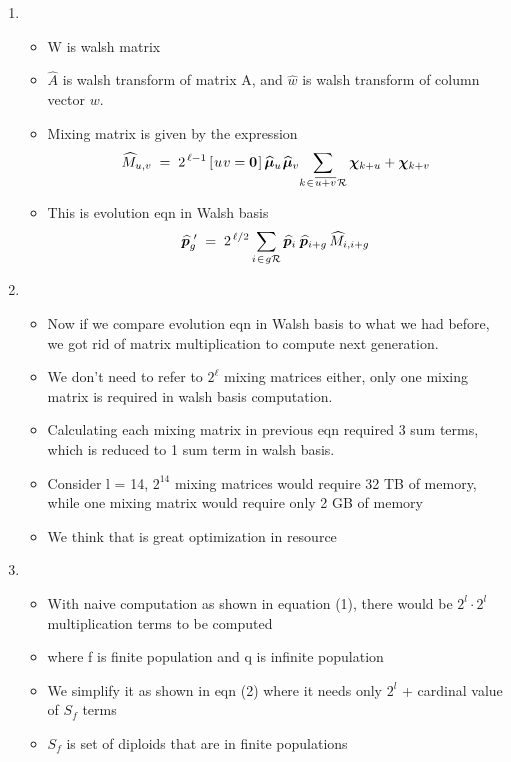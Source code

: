 \documentclass{article}
\newcommand{\nudge}{\hspace{0.01in}}
\begin{document}
\begin{enumerate}
\item
  \begin{itemize}
  \item W is walsh matrix
  \item $\hat{A}$ is walsh transform of matrix A, 
    and $\hat{w}$ is walsh transform of column vector $w$.
  \item Mixing matrix is given by the expression
    \[
      \widehat{M}_{u,v} \; = \; 2^{\,\ell-1} \,[\nudge u \nudge v = {\bf
      0}\nudge]\, \widehat{\bm{\mu}}_u \nudge \widehat{\bm{\mu}}_v \!  \sum_{k
    \nudge \in \nudge \overline{u+v} \nudge \mathcal{R}} \bm{\chi}_{k + u} +
    \bm{\chi}_{k + v}
    \]
  \item This is evolution eqn in Walsh basis 
  \[
    \widehat{\bm{p}}_g^{\,\,\prime} \; = \; 2^{\,\ell/2} \sum_{i \nudge \in \nudge g \mathcal{R}}
    \widehat{\bm{p}}_i \, \nudge \widehat{\bm{p}}_{i+g} \,\widehat{M}_{i,i+g}
  \]  
  \end{itemize}
    
\item
  \begin{itemize}
  \item Now if we compare evolution eqn in Walsh basis to what we had before, we got rid of matrix multiplication to compute next generation. 
  \item We don't need to refer to $2^\ell$ mixing matrices either, only one mixing matrix is required in walsh basis computation.
  \item Calculating each mixing matrix in previous eqn required 3 sum terms, which is reduced to 1 sum term in walsh basis.
  \item Consider l = 14, $2^{14}$ mixing matrices would require 32 TB of
    memory, while one mixing matrix would require only 2 GB of memory
  \item We think that is great optimization in resource
  \end{itemize}
    
\item
  \begin{itemize}
  \item With naive computation as shown in equation (1), there would
    be $2^l \cdot 2^l$ multiplication terms to be computed
  \item where f is finite population and q is infinite population
  \item We simplify it as shown in eqn (2) where it needs only $2^l$ +
    cardinal value of $S_f$ terms
  \item $S_f$ is set of diploids that are in finite populations
  

\end{itemize}
\end{enumerate}
\end{document}
